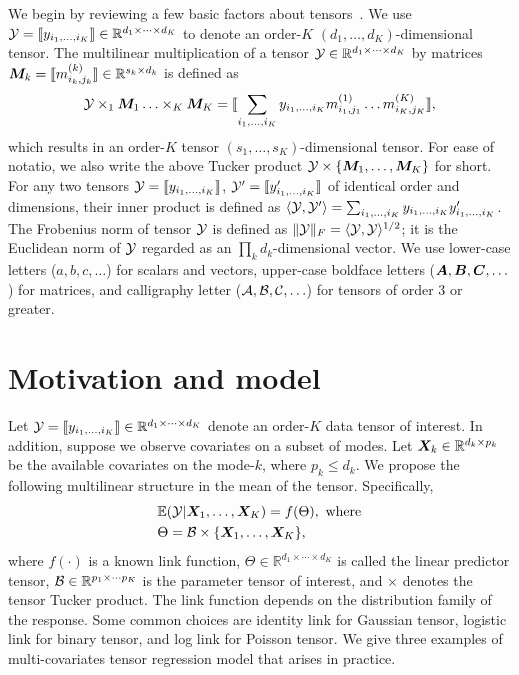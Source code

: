 \documentclass[twoside]{article}
\theoremstyle{plain}
\theoremstyle{definition}
\begin{document}
We begin by reviewing a few basic factors about tensors~\cite{kolda2009tensor}. We use $\mathcal{Y}=\llbracket y_{i_1,\ldots,i_K} \rrbracket\in \mathbb{R}^{d_1\times \cdots\times d_K}$ to denote an order-$K$ $(d_1,\ldots,d_K)$-dimensional tensor. The multilinear multiplication of a tensor $\mathcal{Y}\in\mathbb{R}^{d_1\times \cdots\times d_K}$ by matrices $\bm M_k=\llbracket m_{i_k,j_k}^{(k)} \rrbracket\in\mathbb{R}^{s_k\times d_k}$ is defined as
\[
\mathcal{Y} \times_1\bm M_1\ldots \times_K \bm M_K=\llbracket \sum_{i_1,\ldots,i_K}y_{i_1,\ldots,i_K}m_{i_1,j_1}^{(1)}\ldots m_{i_K,j_K}^{(K)} \rrbracket,
\]
which results in an order-$K$ tensor $(s_1,\ldots,s_K)$-dimensional tensor. For ease of notatio, we also write the above Tucker product $\mathcal{Y}\times\{\bm M_1,\ldots,\bm M_K\}$ for short. For any two tensors $\mathcal{Y}=\llbracket y_{i_1,\ldots,i_K} \rrbracket$, $\mathcal{Y}'=\llbracket y'_{i_1,\ldots,i_K} \rrbracket$ of identical order and dimensions, their inner product is defined as $\langle \mathcal{Y}, \mathcal{Y}'\rangle =\sum_{i_1,\ldots,i_K}y_{i_1,\ldots,i_K}y'_{i_1,\ldots,i_K}$. The Frobenius norm of tensor $\mathcal{Y}$ is defined as $\lVert\mathcal{Y}\rVert_F=\langle \mathcal{Y}, \mathcal{Y} \rangle^{1/2}$; it is the Euclidean norm of $\mathcal{Y}$ regarded as an $\prod_k d_k$-dimensional vector. We use lower-case letters ($a,b,c,\ldots$) for scalars and vectors, upper-case boldface letters ($\bm A,\bm B,\bm C,\ldots$) for matrices, and calligraphy letter ($\mathcal{A}, \mathcal{B}, \mathcal{C},\ldots$) for tensors of order 3 or greater. 


\section{Motivation and model}
Let $\mathcal{Y}=\llbracket y_{i_1,\ldots,i_K} \rrbracket\in\mathbb{R}^{d_1\times \cdots\times d_K}$ denote an order-$K$ data tensor of interest. In addition, suppose we observe covariates on a subset of modes. Let $\bm X_k\in\mathbb{R}^{d_k\times p_k}$ be the available covariates on the mode-$k$, where $p_k\leq d_k$. We propose the following multilinear structure in the mean of the tensor. Specifically, 
\begin{align}\label{eq:tensormodel}
&\mathbb{E}(\mathcal{Y}|\bm X_1,\ldots,\bm X_K)=f(\Theta),\ \text{where}\\
&\Theta =\mathcal{B}\times\{\bm X_1,\ldots,\bm X_K\} ,
\end{align}
where $f(\cdot)$ is a known link function, $\Theta\in\mathbb{R}^{d_1\times \cdots\times d_K}$ is called the linear predictor tensor, $\mathcal{B}\in\mathbb{R}^{p_1\times \cdots p_K}$ is the parameter tensor of interest, and $\times$ denotes the tensor Tucker product. The link function depends on the distribution family of the response. Some common choices are identity link for Gaussian tensor, logistic link for binary tensor, and log link for Poisson tensor. We give three examples of multi-covariates tensor regression model that arises in practice. 
\end{document}
